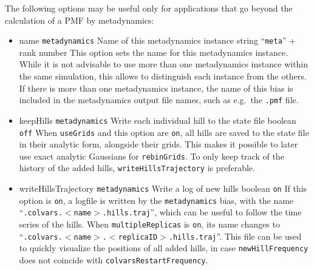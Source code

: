 The following options may be useful only for applications that go beyond the calculation of a PMF by metadynamics:
\begin{itemize}

\item %
  \keydef
    {name}{%
    \texttt{metadynamics}}{%
    Name of this metadynamics instance}{%
    string}{%
    ``\texttt{meta}'' + rank number}{%
    This option sets the name for this metadynamics instance.  While it
    is not advisable to use more than one metadynamics instance within
    the same simulation, this allows to distinguish each instance from
    the others.  If there is more than one metadynamics instance, the
    name of this bias is included in the metadynamics output file names, such as e.g.~the \texttt{.pmf} file.}


\item %
  \keydef
    {keepHills}{%
    \texttt{metadynamics}}{%
    Write each individual hill to the state
    file}{%
    boolean}{%
    \texttt{off}}{%
    When \texttt{useGrids} and this option are \texttt{on}, all hills
    are saved to the state file in their analytic form, alongside their
    grids.  This makes it possible to later use exact analytic Gaussians
    for \texttt{rebinGrids}.  To only keep track of the history of the
    added hills, \texttt{writeHillsTrajectory} is preferable.}

\item %
  \keydef
    {writeHillsTrajectory}{%
    \texttt{metadynamics}}{%
    Write a log of new hills}{%
    boolean}{%
    \texttt{on}}{%
    If this option is \texttt{on}, a logfile is written by the
    \texttt{metadynamics} bias, with the name
    ``\outputName\texttt{.colvars.$<$name$>$.hills.traj}'', which
    can be useful to follow the time series of the hills.  When
    \texttt{multipleReplicas} is \texttt{on}, its name changes to\\
    ``\outputName\texttt{.colvars.$<$name$>$.$<$replicaID$>$.hills.traj}''.
    This file can be used to quickly visualize the positions of all
    added hills, in case \texttt{newHillFrequency} does not coincide
    with \texttt{colvarsRestartFrequency}.}

\end{itemize}



